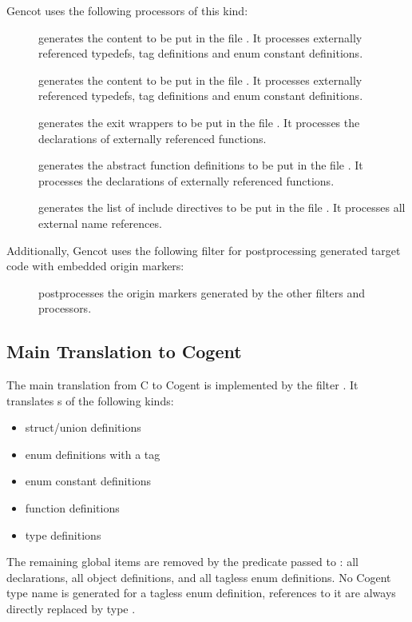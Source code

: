 Gencot uses the following processors of this kind:
\begin{description}
\item[] generates the content to be put in the file . It 
processes externally referenced typedefs, tag definitions and enum constant definitions.
\item[] generates the content to be put in the file . It 
processes externally referenced typedefs, tag definitions and enum constant definitions.
\item[] generates the exit wrappers to be put in the file . It processes
the declarations of externally referenced functions.
\item[] generates the abstract function definitions to be put in the file 
. It processes the declarations of externally referenced functions.
\item[] generates the list of include directives to be put in the file
. It processes all external name references. 
\end{description}

Additionally, Gencot uses the following filter for postprocessing generated target code with embedded origin markers:
\begin{description}
\item[] postprocesses the origin markers generated by the other filters and processors.
\end{description}

\subsection{Main Translation to Cogent}
\label{impl-ccode-main}

The main translation from C to Cogent is implemented by the filter . It translates s
of the following kinds:
\begin{itemize}
\item struct/union definitions
\item enum definitions with a tag
\item enum constant definitions
\item function definitions
\item type definitions
\end{itemize}
The remaining global items are removed by the predicate passed to : all declarations, 
all object definitions, and all tagless enum definitions. No Cogent type name is generated for a tagless enum definition,
references to it are always directly replaced by type .

